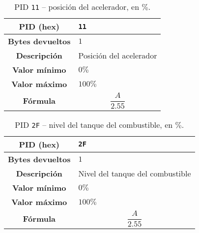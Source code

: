 \begin{table}[H]
  \centering
  \begin{tabularx}{\textwidth}{|c|X|}
    \hline
    \textbf{PID (hex)}       & \texttt{11}             \\
    \hline
    \textbf{Bytes devueltos} & $1$                     \\
    \hline
    \textbf{Descripción}     & Posición del acelerador \\
    \hline
    \textbf{Valor mínimo}    & $0\%$                   \\
    \hline
    \textbf{Valor máximo}    & $100\%$                 \\
    \hline
    \textbf{Fórmula}         &                         %
    \begin{equation*}
      \frac{A}{2.55}
    \end{equation*}                          \\
    \hline
  \end{tabularx}
  \caption{\ac{PID} \texttt{11} -- posición del acelerador, en $\%$.}
\end{table}

\begin{table}[H]
  \centering
  \begin{tabularx}{\textwidth}{|c|X|}
    \hline
    \textbf{PID (hex)}       & \texttt{2F}                      \\
    \hline
    \textbf{Bytes devueltos} & $1$                              \\
    \hline
    \textbf{Descripción}     & Nivel del tanque del combustible \\
    \hline
    \textbf{Valor mínimo}    & $0\%$                            \\
    \hline
    \textbf{Valor máximo}    & $100\%$                          \\
    \hline
    \textbf{Fórmula}         &                                  %
    \begin{equation*}
      \frac{A}{2.55}
    \end{equation*}                                   \\
    \hline
  \end{tabularx}
  \caption{\ac{PID} \texttt{2F} -- nivel del tanque del combustible, en $\%$.}
\end{table}

